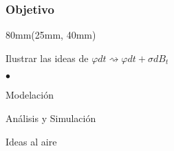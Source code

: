 \begin{frame}
    \frametitle{Objetivo}
    \begin{textblock*}{80mm}(25mm, 40mm)
            \begin{yellowbox}{%
                Ilustrar las ideas de 
                $
                    \varphi dt 
                    \rightsquigarrow 
                    \varphi dt 
                    + 
                    \sigma dB_t
                $
            }
                \begin{list}{$\bullet$}{}
                    \item
                        Modelación
                    \item
                        Análisis y Simulación 
                    \item
                        Ideas al aire
                \end{list}
            \end{yellowbox}
    \end{textblock*}
\end{frame}